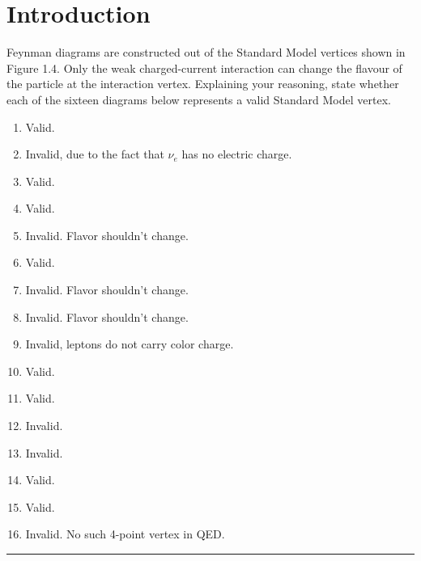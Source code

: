 \section{Introduction}

\begin{problem}{1.1}
Feynman diagrams are constructed out of the Standard Model vertices shown in Figure 1.4.
Only the weak charged-current interaction can change the flavour of the particle at the interaction vertex.
Explaining your reasoning, state whether each of the sixteen diagrams below represents a valid Standard Model vertex.
\end{problem}
\begin{solution}
\begin{enumerate}[label=(\alph*)]
    \item Valid. 
    \item Invalid, due to the fact that $\nu_e$ has no electric charge. 
    \item Valid.
    \item Valid.
    \item Invalid. Flavor shouldn't change. 
    \item Valid.
    \item Invalid. Flavor shouldn't change. 
    \item Invalid. Flavor shouldn't change. 
    \item Invalid, leptons do not carry color charge.
    \item Valid. 
    \item Valid.
    \item Invalid.
    \item Invalid.
    \item Valid.
    \item Valid.
    \item Invalid. No such 4-point vertex in QED.
\end{enumerate}
\end{solution} 
\noindent\rule{7in}{1.5pt}
    
    

